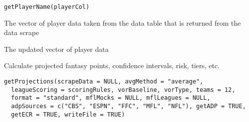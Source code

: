 \documentclass[a4paper]{book}
\begin{document}
%
\begin{Usage}
\begin{verbatim}
getPlayerName(playerCol)
\end{verbatim}
\end{Usage}
%
\begin{Arguments}
\begin{ldescription}
\item[\code{playerCol}] The vector of player data taken from the data table that is returned from
the data scrape
\end{ldescription}
\end{Arguments}
%
\begin{Value}
The updated vector of player data
\end{Value}
%
\begin{Description}\relax
Calculate projected fantasy points, confidence intervals, risk, tiers, etc.
\end{Description}
%
\begin{Usage}
\begin{verbatim}
getProjections(scrapeData = NULL, avgMethod = "average",
  leagueScoring = scoringRules, vorBaseline, vorType, teams = 12,
  format = "standard", mflMocks = NULL, mflLeagues = NULL,
  adpSources = c("CBS", "ESPN", "FFC", "MFL", "NFL"), getADP = TRUE,
  getECR = TRUE, writeFile = TRUE)
\end{verbatim}
\end{Usage}
%
\end{document}
